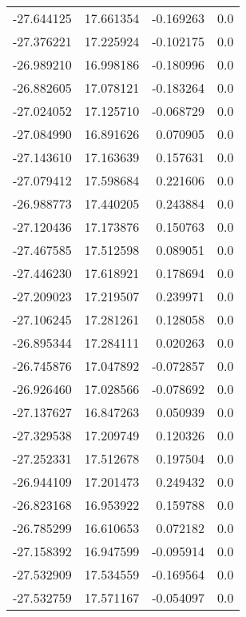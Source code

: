 \begin{tabular}{rrrr}
      -27.644125 &        17.661354 &   -0.169263 &   0.0 \\
      -27.376221 &        17.225924 &   -0.102175 &   0.0 \\
      -26.989210 &        16.998186 &   -0.180996 &   0.0 \\
      -26.882605 &        17.078121 &   -0.183264 &   0.0 \\
      -27.024052 &        17.125710 &   -0.068729 &   0.0 \\
      -27.084990 &        16.891626 &    0.070905 &   0.0 \\
      -27.143610 &        17.163639 &    0.157631 &   0.0 \\
      -27.079412 &        17.598684 &    0.221606 &   0.0 \\
      -26.988773 &        17.440205 &    0.243884 &   0.0 \\
      -27.120436 &        17.173876 &    0.150763 &   0.0 \\
      -27.467585 &        17.512598 &    0.089051 &   0.0 \\
      -27.446230 &        17.618921 &    0.178694 &   0.0 \\
      -27.209023 &        17.219507 &    0.239971 &   0.0 \\
      -27.106245 &        17.281261 &    0.128058 &   0.0 \\
      -26.895344 &        17.284111 &    0.020263 &   0.0 \\
      -26.745876 &        17.047892 &   -0.072857 &   0.0 \\
      -26.926460 &        17.028566 &   -0.078692 &   0.0 \\
      -27.137627 &        16.847263 &    0.050939 &   0.0 \\
      -27.329538 &        17.209749 &    0.120326 &   0.0 \\
      -27.252331 &        17.512678 &    0.197504 &   0.0 \\
      -26.944109 &        17.201473 &    0.249432 &   0.0 \\
      -26.823168 &        16.953922 &    0.159788 &   0.0 \\
      -26.785299 &        16.610653 &    0.072182 &   0.0 \\
      -27.158392 &        16.947599 &   -0.095914 &   0.0 \\
      -27.532909 &        17.534559 &   -0.169564 &   0.0 \\
      -27.532759 &        17.571167 &   -0.054097 &   0.0 \\

\end{tabular}
